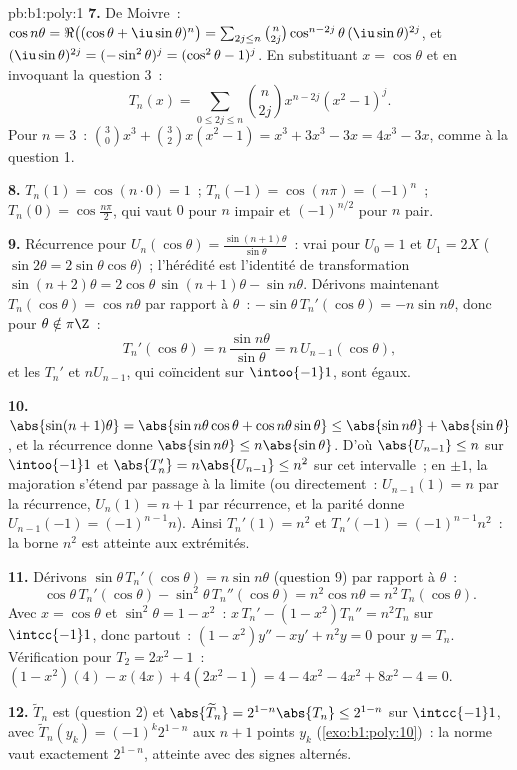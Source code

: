 \begin{solution}{pb:b1:poly:1}
\textbf{7.} De Moivre~: $\cos n\theta = \Re\bigl((\cos\theta +
\iu\sin\theta)^n\bigr) = \sum_{2j \leq n}\binom n{2j}
\cos^{n-2j}\theta\,(\iu\sin\theta)^{2j}$, et $(\iu\sin\theta)^{2j}
= (-\sin^2\theta)^j = (\cos^2\theta - 1)^j$. En substituant $x =
\cos\theta$ et en invoquant la question 3~:
\[
T_n(x) = \sum_{0\leq 2j\leq n}\binom n{2j}x^{n-2j}(x^2 - 1)^j .
\]
Pour $n = 3$~: $\binom30 x^3 + \binom32 x(x^2 - 1) = x^3 + 3x^3 -
3x = 4x^3 - 3x$, comme à la question 1.

\textbf{8.} $T_n(1) = \cos(n\cdot0) = 1$~; $T_n(-1) = \cos(n\pi) =
(-1)^n$~; $T_n(0) = \cos\frac{n\pi}2$, qui vaut $0$ pour $n$ impair
et $(-1)^{n/2}$ pour $n$ pair.

\textbf{9.} Récurrence pour $U_n(\cos\theta) =
\frac{\sin(n+1)\theta}{\sin\theta}$~: vrai pour $U_0 = 1$ et $U_1 =
2X$ ($\sin2\theta = 2\sin\theta\cos\theta$)~; l'hérédité est
l'identité de transformation $\sin(n+2)\theta = 2\cos\theta\,
\sin(n+1)\theta - \sin n\theta$. Dérivons maintenant
$T_n(\cos\theta) = \cos n\theta$ par rapport à $\theta$~:
$-\sin\theta\,T_n'(\cos\theta) = -n\sin n\theta$, donc pour $\theta
\notin \pi\Z$~:
\[
T_n'(\cos\theta) = n\,\frac{\sin n\theta}{\sin\theta}
= n\,U_{n-1}(\cos\theta) ,
\]
et les  $T_n'$ et $nU_{n-1}$, qui coïncident sur
$\intoo{-1}1$, sont égaux.

\textbf{10.} $\abs{\sin(n+1)\theta} = \abs{\sin n\theta\cos\theta
+ \cos n\theta\sin\theta} \leq \abs{\sin n\theta} +
\abs{\sin\theta}$, et la récurrence donne $\abs{\sin n\theta} \leq
n\abs{\sin\theta}$. D'où $\abs{U_{n-1}} \leq n$ sur $\intoo{-1}1$
et $\abs{T_n'} = n\abs{U_{n-1}} \leq n^2$ sur cet intervalle~; en
$\pm1$, la majoration s'étend par passage à la limite (ou
directement~: $U_{n-1}(1) = n$ par la récurrence, $U_n(1) = n + 1$
par récurrence, et la parité donne $U_{n-1}(-1) = (-1)^{n-1}n$).
Ainsi $T_n'(1) = n^2$ et $T_n'(-1) = (-1)^{n-1}n^2$~: la borne $n^2$
est atteinte aux extrémités.

\textbf{11.} Dérivons $\sin\theta\,T_n'(\cos\theta) = n\sin
n\theta$ (question 9) par rapport à $\theta$~:
\[
\cos\theta\,T_n'(\cos\theta) - \sin^2\theta\,T_n''(\cos\theta)
= n^2\cos n\theta = n^2\,T_n(\cos\theta) .
\]
Avec $x = \cos\theta$ et $\sin^2\theta = 1 - x^2$~: $x\,T_n' - (1
- x^2)T_n'' = n^2T_n$ sur $\intcc{-1}1$, donc partout~:
$(1 - x^2)y'' - xy' + n^2y = 0$ pour $y = T_n$. Vérification pour
$T_2 = 2x^2 - 1$~: $(1 - x^2)(4) - x(4x) + 4(2x^2 - 1) = 4 - 4x^2 -
4x^2 + 8x^2 - 4 = 0$.

\textbf{12.} $\widetilde T_n$ est  (question 2) et
$\abs{\widetilde T_n} = 2^{1-n}\abs{T_n} \leq 2^{1-n}$ sur
$\intcc{-1}1$, avec $\widetilde T_n(y_k) = (-1)^k2^{1-n}$ aux $n +
1$ points $y_k$ (\cref{exo:b1:poly:10})~: la norme vaut exactement
$2^{1-n}$, atteinte avec des signes alternés.


\end{solution}
